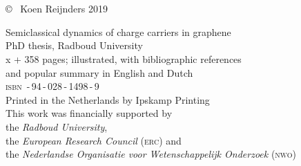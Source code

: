 \frenchspacing
\raggedbottom

\thispagestyle{empty}
\vspace*{4em}
\begin{center}
\huge{}\\
\huge{}\\[1em]
\end{center}
\newpage

\thispagestyle{empty}
\null
\vfill

\setlength{\marginparwidth}{2em}
\setlength{\marginparsep}{0.75em}

\noindent \copyright~ Koen Reijnders 2019


\noindent Semiclassical dynamics of charge carriers in graphene\\
PhD thesis, Radboud University\\
x + 358 pages; illustrated, with bibliographic references \\ and popular summary in English and Dutch\\[2ex]
{\scshape isbn} \,-\,94\,-\,028\,-\,1498\,-\,9\\[2ex]
Printed in the Netherlands by Ipskamp Printing\\[2ex]
This work was financially supported by \\ the \emph{Radboud University}, \\ the \emph{European Research Council} (\textsc{erc}) and \\ the \emph{Nederlandse Organisatie voor Wetenschappelijk Onderzoek} \textsc{(nwo)}


